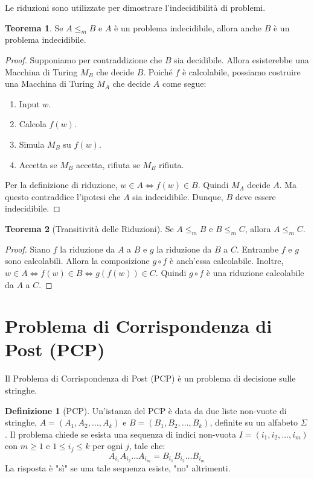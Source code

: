 \documentclass[a4paper]{article}
\theoremstyle{definition} %
\newtheorem{theorem}{Teorema}
\newtheorem{definition}{Definizione}
\theoremstyle{remark} %
\begin{document}
Le riduzioni sono utilizzate per dimostrare l'indecidibilità di problemi.
\begin{theorem}
Se $A \le_m B$ e $A$ è un problema indecidibile, allora anche $B$ è un problema indecidibile.
\end{theorem}
\begin{proof}
Supponiamo per contraddizione che $B$ sia decidibile. Allora esisterebbe una Macchina di Turing $M_B$ che decide $B$.
Poiché $f$ è calcolabile, possiamo costruire una Macchina di Turing $M_A$ che decide $A$ come segue:
\begin{enumerate}
    \item Input $w$.
    \item Calcola $f(w)$.
    \item Simula $M_B$ su $f(w)$.
    \item Accetta se $M_B$ accetta, rifiuta se $M_B$ rifiuta.
\end{enumerate}
Per la definizione di riduzione, $w \in A \iff f(w) \in B$. Quindi $M_A$ decide $A$. Ma questo contraddice l'ipotesi che $A$ sia indecidibile. Dunque, $B$ deve essere indecidibile.
\end{proof}

\begin{theorem}[Transitività delle Riduzioni]
Se $A \le_m B$ e $B \le_m C$, allora $A \le_m C$.
\end{theorem}
\begin{proof}
Siano $f$ la riduzione da $A$ a $B$ e $g$ la riduzione da $B$ a $C$.
Entrambe $f$ e $g$ sono calcolabili. Allora la composizione $g \circ f$ è anch'essa calcolabile.
Inoltre, $w \in A \iff f(w) \in B \iff g(f(w)) \in C$.
Quindi $g \circ f$ è una riduzione calcolabile da $A$ a $C$.
\end{proof}

\section{Problema di Corrispondenza di Post (PCP)}

Il Problema di Corrispondenza di Post (PCP) è un problema di decisione sulle stringhe.

\begin{definition}[PCP]
Un'istanza del PCP è data da due liste non-vuote di stringhe, $A = (A_1, A_2, \dots, A_k)$ e $B = (B_1, B_2, \dots, B_k)$, definite su un alfabeto $\Sigma$.
Il problema chiede se esista una sequenza di indici non-vuota $I = (i_1, i_2, \dots, i_m)$ con $m \ge 1$ e $1 \le i_j \le k$ per ogni $j$, tale che:
$$A_{i_1} A_{i_2} \dots A_{i_m} = B_{i_1} B_{i_2} \dots B_{i_m}$$
La risposta è "sì" se una tale sequenza esiste, "no" altrimenti.
\end{definition}
\end{document}
